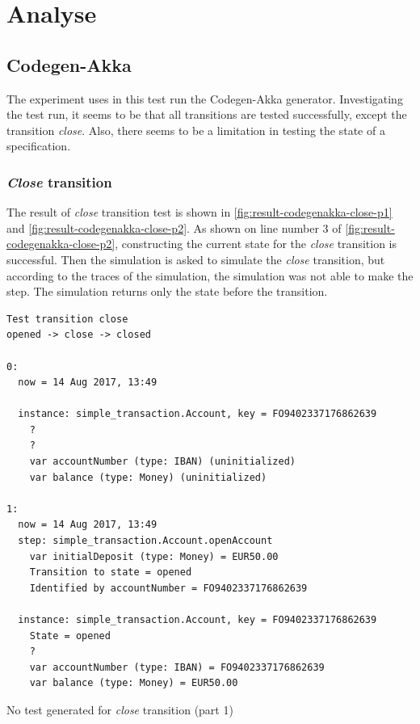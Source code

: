 \section{Analyse}

\subsection{Codegen-Akka}
The experiment uses in this test run the Codegen-Akka generator.
Investigating the test run, it seems to be that all transitions are tested
successfully, except the transition \textit{close}. Also, there seems to be a
limitation in testing the state of a specification.

\subsubsection{\textit{Close} transition}\label{sec:close-no-test-codegenakka}

The result of \textit{close} transition test is shown in
\autoref{fig:result-codegenakka-close-p1} and \autoref{fig:result-codegenakka-close-p2}.
As shown on line number 3 of \autoref{fig:result-codegenakka-close-p2}, 
constructing the current state for the \textit{close} transition is successful. Then the
simulation is asked to simulate the \textit{close} transition, but according to the
traces of the simulation, the simulation was not able to make the step. The
simulation returns only the state before the transition.

\begin{sourcecode}[h!]
\begin{lstlisting}[]
Test transition close
opened -> close -> closed

0:
  now = 14 Aug 2017, 13:49

  instance: simple_transaction.Account, key = FO9402337176862639
    ?
    ?
    var accountNumber (type: IBAN) (uninitialized)
    var balance (type: Money) (uninitialized)

1:
  now = 14 Aug 2017, 13:49
  step: simple_transaction.Account.openAccount
    var initialDeposit (type: Money) = EUR50.00
    Transition to state = opened
    Identified by accountNumber = FO9402337176862639

  instance: simple_transaction.Account, key = FO9402337176862639
    State = opened
    ?
    var accountNumber (type: IBAN) = FO9402337176862639
    var balance (type: Money) = EUR50.00
\end{lstlisting}
\caption{No test generated for \textit{close} transition (part 1)}\label{fig:result-codegenakka-close-p1}
\end{sourcecode}
\FloatBarrier

